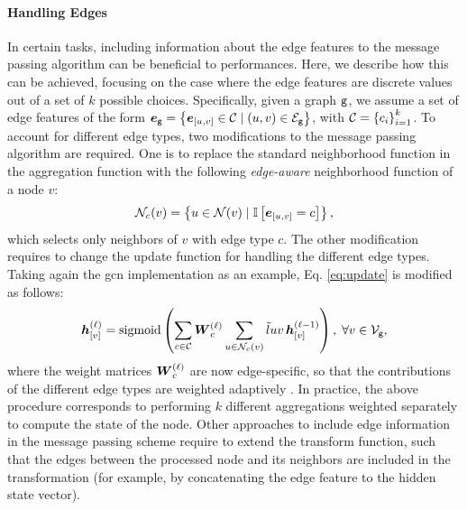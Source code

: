 \paragraph{Handling Edges}
In certain tasks, including information about the edge features to the message passing algorithm can be beneficial to performances. Here, we describe how this can be achieved, focusing on the case where the edge features are discrete values out of a set of $k$ possible choices. Specifically, given a graph $\mathtt{g}$, we assume a set of edge features of the form $\GraphFeatures{e}{g} = \Set{\Elem{e}{u,v} \in \Cal{C} \mid (u, v) \in \Edges{g}}$, with $\Cal{C} = \Set{c_i}_{i=1}^k$. To account for different edge types, two modifications to the message passing algorithm are required. One is to replace the standard neighborhood function in the aggregation function with the following \emph{edge-aware} neighborhood function of a node $v$:
$$\Neigh_c(v) = \Set{u \in \Neigh(v) \mid \Indicator{\Elem{e}{u, v} = c}},$$
which selects only neighbors of $v$ with edge type $c$. The other modification requires to change the update function for handling the different edge types. Taking again the \gls{gcn} implementation as an example, Eq. \ref{eq:update} is modified as follows:
\begin{align*}
    \StateVector{v}{\ell} = \sigmoid\Par{\sum_{c \in \Cal{C}} \LayerMatrix{w}{\ell}_c \sum_{u \in \Neigh_c(v)} \tilde{l}{uv}\,\Elem{h}{v}^{(\ell-1)}},\; \forall v \in \Nodes{g},
\end{align*}
where the weight matrices $\LayerMatrix{w}{\ell}_c $ are now edge-specific, so that the contributions of the different edge types are weighted adaptively \citep{micheli2009nn4g,schlichtkrull2018relationaldatagcn}. In practice, the above procedure corresponds to performing $k$ different aggregations weighted separately to compute the state of the node. Other approaches to include edge information in the message passing scheme require to extend the transform function, such that the edges between the processed node and its neighbors are included in the transformation (for example, by concatenating the edge feature to the hidden state vector).

